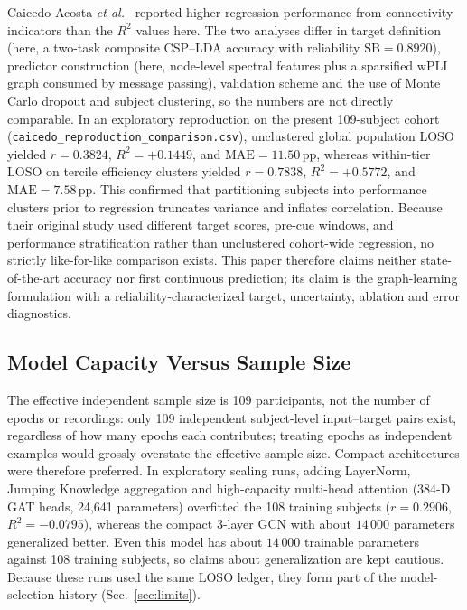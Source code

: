 \documentclass{ieeeaccess}
\newcommand{\pp}{\,\text{pp}}
\begin{document}
Caicedo-Acosta \textit{et al.}~\cite{caicedo2021} reported higher regression performance from connectivity indicators than the $R^2$ values here. The two analyses differ in target definition (here, a two-task composite CSP--LDA accuracy with reliability $\mathrm{SB}=0.8920$), predictor construction (here, node-level spectral features plus a sparsified wPLI graph consumed by message passing), validation scheme and the use of Monte Carlo dropout and subject clustering, so the numbers are not directly comparable. In an exploratory reproduction on the present 109-subject cohort (\texttt{caicedo\_reproduction\_comparison.csv}), unclustered global population LOSO yielded $r = 0.3824$, $R^2 = +0.1449$, and $\text{MAE} = 11.50\pp$, whereas within-tier LOSO on tercile efficiency clusters yielded $r = 0.7838$, $R^2 = +0.5772$, and $\text{MAE} = 7.58\pp$. This confirmed that partitioning subjects into performance clusters prior to regression truncates variance and inflates correlation. Because their original study used different target scores, pre-cue windows, and performance stratification rather than unclustered cohort-wide regression, no strictly like-for-like comparison exists. This paper therefore claims neither state-of-the-art accuracy nor first continuous prediction; its claim is the graph-learning formulation with a reliability-characterized target, uncertainty, ablation and error diagnostics.

\subsection{Model Capacity Versus Sample Size}

The effective independent sample size is 109 participants, not the number of epochs or recordings: only 109 independent subject-level input--target pairs exist, regardless of how many epochs each contributes; treating epochs as independent examples would grossly overstate the effective sample size. Compact architectures were therefore preferred. In exploratory scaling runs, adding LayerNorm, Jumping Knowledge aggregation and high-capacity multi-head attention (384-D GAT heads, 24,641 parameters) overfitted the 108 training subjects ($r=0.2906$, $R^2=-0.0795$), whereas the compact 3-layer GCN with about $14\,000$ parameters generalized better. Even this model has about $14\,000$ trainable parameters against 108 training subjects, so claims about generalization are kept cautious. Because these runs used the same LOSO ledger, they form part of the model-selection history (Sec.~\ref{sec:limits}).
\end{document}
